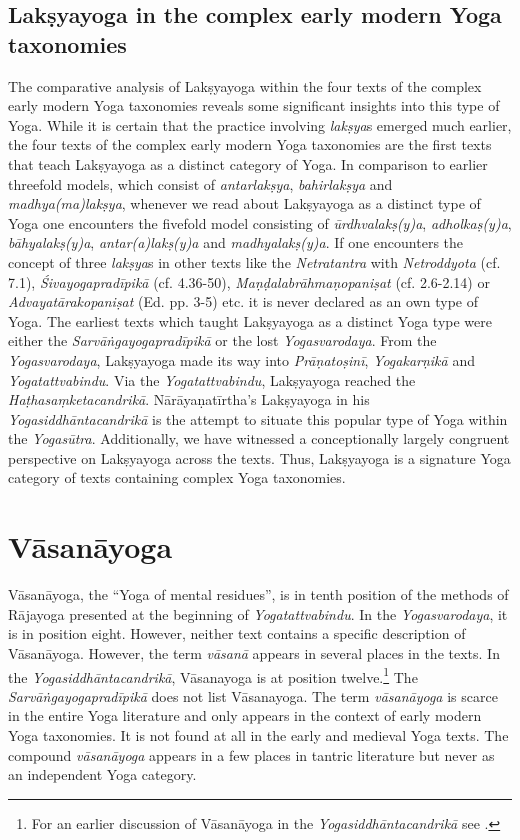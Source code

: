 \subsection{Lakṣyayoga in the complex early modern Yoga taxonomies}

The comparative analysis of Lakṣyayoga within the four texts of the complex early modern Yoga taxonomies reveals some significant insights into this type of Yoga. While it is certain that the practice involving \textit{lakṣya}s emerged much earlier, the four texts of the complex early modern Yoga taxonomies are the first texts that teach Lakṣyayoga as a distinct category of Yoga. In comparison to earlier threefold models, which consist of \textit{antarlakṣya}, \textit{bahirlakṣya} and \textit{madhya(ma)lakṣya}, whenever we read about Lakṣyayoga as a distinct type of Yoga one encounters the fivefold model consisting of \textit{ūrdhvalakṣ(y)a}, \textit{adholkaṣ(y)a}, \textit{bāhyalakṣ(y)a}, \textit{antar(a)lakṣ(y)a} and \textit{madhyalakṣ(y)a}. If one encounters the concept of three \textit{lakṣya}s in other texts like the \emph{Netratantra} with \emph{Netroddyota} (cf. 7.1), \emph{Śivayogapradīpikā} (cf. 4.36-50), \emph{Maṇḍalabrāhmaṇopaniṣat} (cf. 2.6-2.14) or \emph{Advayatārakopaniṣat} (Ed. pp. 3-5) etc. it is never declared as an own type of Yoga. The earliest texts which taught Lakṣyayoga as a distinct Yoga type were either the \emph{Sarvāṅgayogapradīpikā} or the lost \emph{Yogasvarodaya}. From the \emph{Yogasvarodaya}, Lakṣyayoga made its way into \emph{Prāṇatoṣinī}, \emph{Yogakarṇikā} and \emph{Yogatattvabindu}. Via the \emph{Yogatattvabindu}, Lakṣyayoga reached the \emph{Haṭhasaṃketacandrikā}. Nārāyaṇatīrtha's Lakṣyayoga in his \emph{Yogasiddhāntacandrikā} is the attempt to situate this popular type of Yoga within the \emph{Yogasūtra}. Additionally, we have witnessed a conceptionally largely congruent perspective on Lakṣyayoga across the texts. Thus, Lakṣyayoga is a signature Yoga category of texts containing complex Yoga taxonomies.

\section{Vāsanāyoga}
\label{vasanayogaintro}

Vāsanāyoga, the ``Yoga of mental residues'', is in tenth position of the methods of Rājayoga presented at the beginning of \textit{Yogatattvabindu}. In the \textit{Yogasvarodaya}, it is in position eight. However, neither text contains a specific description of Vāsanāyoga. However, the term \textit{vāsanā} appears in several places in the texts. In the \textit{Yogasiddhāntacandrikā}, Vāsanayoga is at position twelve.\footnote{For an earlier discussion of Vāsanāyoga in the \textit{Yogasiddhāntacandrikā} see \citeauthor[2004: 82-85]{penna2004}.} The \textit{Sarvāṅgayogapradīpikā} does not list Vāsanayoga. The term \textit{vāsanāyoga} is scarce in the entire Yoga literature and only appears in the context of early modern Yoga taxonomies. It is not found at all in the early and medieval Yoga texts. The compound \textit{vāsanāyoga} appears in a few places in tantric literature but never as an independent Yoga category.  

